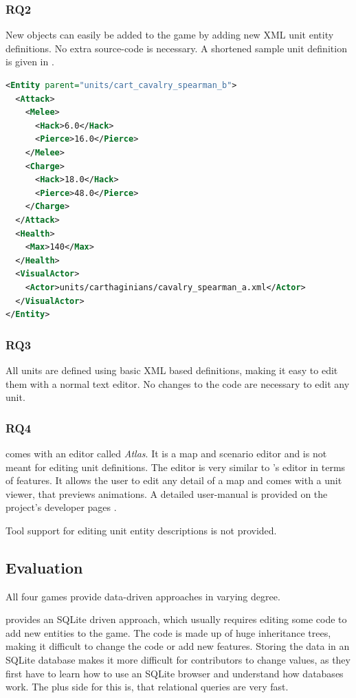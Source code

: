 \subsubsection{RQ2}
New objects can easily be added to the game by adding new XML unit entity definitions. No extra source-code is
necessary. A shortened sample unit definition is given in .

\begin{lstlisting}[language=XML,caption=A basic \AD{} (shortened) unit definition in XML, label=0adxml]
<Entity parent="units/cart_cavalry_spearman_b">
  <Attack>
    <Melee>
      <Hack>6.0</Hack>
      <Pierce>16.0</Pierce>
    </Melee>
    <Charge>
      <Hack>18.0</Hack>
      <Pierce>48.0</Pierce>
    </Charge>
  </Attack>
  <Health>
    <Max>140</Max>
  </Health>
  <VisualActor>
    <Actor>units/carthaginians/cavalry_spearman_a.xml</Actor>
  </VisualActor>
</Entity>
\end{lstlisting}

\subsubsection{RQ3}
All units are defined using basic XML based definitions, making it easy to edit them with a normal text editor. No
changes to the code are necessary to edit any unit.

\subsubsection{RQ4}
\AD{} comes with an editor called \textit{Atlas}. It is a map and scenario editor and is not meant for editing unit
definitions. The editor is very similar to \GLEST{}'s editor in terms of features. It allows the user to edit any detail
of a map and comes with a unit viewer, that previews animations. A detailed user-manual is provided on the project's developer
pages \cite{0adeditor}.

Tool support for editing unit entity descriptions is not provided.

\subsection{Evaluation}
All four games provide data-driven approaches in varying degree.

\UH{} provides an SQLite driven approach, which usually requires editing some code to add new entities to the game. The
code is made up of huge inheritance trees, making it difficult to change the code or add new features. Storing the data
in an SQLite database makes it more difficult for contributors to change values, as they first have to learn how to use
an SQLite browser and understand how databases work. The plus side for this is, that relational queries are very fast.


